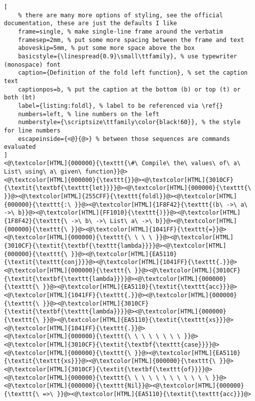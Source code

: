 \begin{lstlisting}[
	% there are many more options of styling, see the official documentation, these are just the defaults I like
	frame=single, % make single-line frame around the verbatim
	framesep=2mm, % put some more spacing between the frame and text
	aboveskip=5mm, % put some more space above the box
	basicstyle={\linespread{0.9}\small\ttfamily}, % use typewriter (monospace) font
	caption={Definition of the fold left function}, % set the caption text
	captionpos=b, % put the caption at the bottom (b) or top (t) or both (bt)
    label={listing:foldl}, % label to be referenced via \ref{}
	numbers=left, % line numbers on the left
	numberstyle={\scriptsize\ttfamily\color{black!60}}, % the style for line numbers
	escapeinside={<@}{@>} % between those sequences are commands evaluated
]
<@\textcolor[HTML]{000000}{\texttt{\#\ Compile\ the\ values\ of\ a\ List\ using\ a\ given\ function}}@>
<@\textcolor[HTML]{000000}{\texttt{}}@><@\textcolor[HTML]{3010CF}{\textit{\textbf{\texttt{let}}}}@><@\textcolor[HTML]{000000}{\texttt{\ }}@><@\textcolor[HTML]{255CFF}{\texttt{foldl}}@><@\textcolor[HTML]{000000}{\texttt{:\ }}@><@\textcolor[HTML]{1F8F42}{\texttt{(b\ ->\ a\ ->\ b}}@><@\textcolor[HTML]{FF1010}{\texttt{)}}@><@\textcolor[HTML]{1F8F42}{\texttt{\ ->\ b\ ->\ List\ a\ ->\ b}}@><@\textcolor[HTML]{000000}{\texttt{\ }}@><@\textcolor[HTML]{1041FF}{\texttt{=}}@>
<@\textcolor[HTML]{000000}{\texttt{\ \ \ \ }}@><@\textcolor[HTML]{3010CF}{\textit{\textbf{\texttt{lambda}}}}@><@\textcolor[HTML]{000000}{\texttt{\ }}@><@\textcolor[HTML]{EA5110}{\textit{\texttt{conj}}}@><@\textcolor[HTML]{1041FF}{\texttt{.}}@><@\textcolor[HTML]{000000}{\texttt{\ }}@><@\textcolor[HTML]{3010CF}{\textit{\textbf{\texttt{lambda}}}}@><@\textcolor[HTML]{000000}{\texttt{\ }}@><@\textcolor[HTML]{EA5110}{\textit{\texttt{acc}}}@><@\textcolor[HTML]{1041FF}{\texttt{.}}@><@\textcolor[HTML]{000000}{\texttt{\ }}@><@\textcolor[HTML]{3010CF}{\textit{\textbf{\texttt{lambda}}}}@><@\textcolor[HTML]{000000}{\texttt{\ }}@><@\textcolor[HTML]{EA5110}{\textit{\texttt{xs}}}@><@\textcolor[HTML]{1041FF}{\texttt{.}}@>
<@\textcolor[HTML]{000000}{\texttt{\ \ \ \ \ \ \ \ }}@><@\textcolor[HTML]{3010CF}{\textit{\textbf{\texttt{case}}}}@><@\textcolor[HTML]{000000}{\texttt{\ }}@><@\textcolor[HTML]{EA5110}{\textit{\texttt{xs}}}@><@\textcolor[HTML]{000000}{\texttt{\ }}@><@\textcolor[HTML]{3010CF}{\textit{\textbf{\texttt{of}}}}@>
<@\textcolor[HTML]{000000}{\texttt{\ \ \ \ \ \ \ \ \ \ \ \ }}@><@\textcolor[HTML]{000000}{\texttt{Nil}}@><@\textcolor[HTML]{000000}{\texttt{\ =>\ }}@><@\textcolor[HTML]{EA5110}{\textit{\texttt{acc}}}@>

\end{lstlisting}
